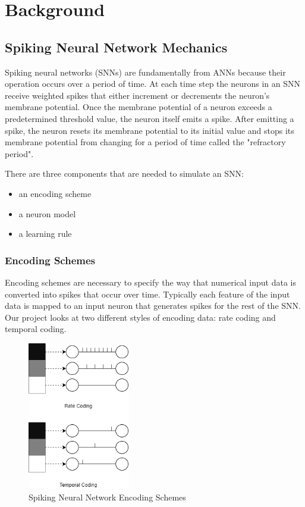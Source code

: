 \documentclass[journal]{IEEEtran}
\begin{document}
\section{Background}

\subsection{Spiking Neural Network Mechanics}

Spiking neural networks (SNNs) are fundamentally from ANNs because their operation occurs over a period of time. At each time step the neurons in an SNN receive weighted spikes that either increment or decrements the neuron's membrane potential. Once the membrane potential of a neuron exceeds a predetermined threshold value, the neuron itself emits a spike. After emitting a spike, the neuron resets its membrane potential to its initial value and stops its membrane potential from changing for a period of time called the "refractory period".

There are three components that are needed to simulate an SNN:

\begin{itemize}
\item an encoding scheme
\item a neuron model
\item a learning rule
\end{itemize}

\subsubsection{Encoding Schemes}

Encoding schemes are necessary to specify the way that numerical input data is converted into spikes that occur over time. Typically each feature of the input data is mapped to an input neuron that generates spikes for the rest of the SNN. Our project looks at two different styles of encoding data: rate coding and temporal coding.

\begin{figure}[!t]
\centering
\includegraphics[width=1.75in]{encodings.png}
\caption{Spiking Neural Network Encoding Schemes}
\label{fig_sim}
\end{figure}
\end{document}
